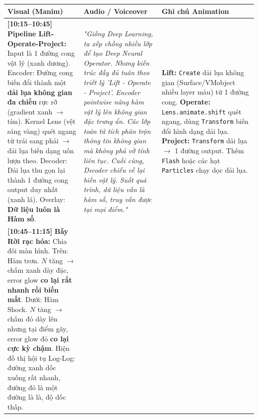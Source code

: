 \noindent
\setlength{\tabcolsep}{4pt}
\renewcommand{\arraystretch}{1.2}
\begin{tabularx}{\textwidth}{|p{3.6cm}|>{\raggedright\arraybackslash}X|p{4.6cm}|}
\hline
\textbf{Visual (Manim)} & \textbf{Audio / Voiceover} & \textbf{Ghi chú Animation} \\ \hline
\textbf{[10:15--10:45]} \newline 
\textbf{Pipeline Lift-Operate-Project:} \newline 
Input là 1 đường cong vật lý (xanh dương). \newline 
Encoder: Đường cong biến đổi thành một \textbf{dải lụa không gian đa chiều} rực rỡ (gradient xanh $\to$ tím). \newline 
Kernel Lens (vệt sáng vàng) quét ngang từ trái sang phải $\to$ dải lụa biến dạng uốn lượn theo. \newline 
Decoder: Dải lụa thu gọn lại thành 1 đường cong output duy nhất (xanh lá). \newline 
Overlay: \textbf{Dữ liệu luôn là Hàm số}.
& \textit{"Giống Deep Learning, ta xếp chồng nhiều lớp để tạo Deep Neural Operator. Nhưng kiến trúc đầy đủ tuân theo triết lý 'Lift - Operate - Project'. Encoder pointwise nâng hàm vật lý lên không gian đặc trưng ẩn. Các lớp toán tử tích phân trộn thông tin không gian mà không phá vỡ tính liên tục. Cuối cùng, Decoder chiếu về lại biến vật lý. Suốt quá trình, dữ liệu vẫn là hàm số, truy vấn được tại mọi điểm."} 
& \textbf{Lift:} \texttt{Create} dải lụa không gian (Surface/VMobject nhiều layer màu) từ 1 đường cong. \newline 
\textbf{Operate:} \texttt{Lens.animate.shift} quét ngang, dùng \texttt{Transform} biến đổi hình dạng dải lụa. \newline 
\textbf{Project:} \texttt{Transform} dải lụa $\to$ 1 đường output. \newline 
Thêm \texttt{Flash} hoặc các hạt \texttt{Particles} chạy dọc dải lụa. \\ \hline
\textbf{[10:45--11:15]} \newline 
\textbf{Bẫy Rời rạc hóa:} \newline 
Chia đôi màn hình. \newline 
Trên: Hàm trơn. $N$ tăng $\to$ chấm xanh dày đặc, error glow \textbf{co lại rất nhanh rồi biến mất}. \newline 
Dưới: Hàm Shock. $N$ tăng $\to$ chấm đỏ dày lên nhưng tại điểm gãy, error glow đỏ \textbf{co lại cực kỳ chậm}. \newline 
Hiện đồ thị hội tụ Log-Log: đường xanh dốc xuống rất nhanh, đường đỏ là một đường là là, độ dốc thấp. \newline 

\end{tabularx}
